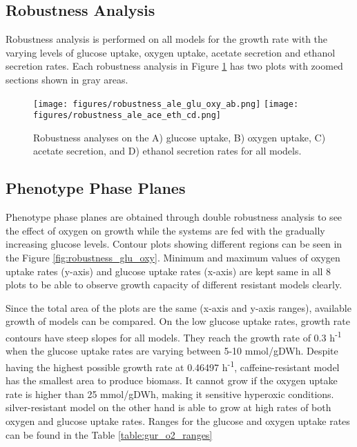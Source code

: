 \subsection{Robustness Analysis}

Robustness analysis is performed on all models for the growth rate with the varying levels of glucose uptake, oxygen uptake, acetate secretion and ethanol secretion rates. Each robustness analysis in Figure \ref{fig:robustness_ale} has two plots with zoomed sections shown in gray areas.

\begin{figure}[H]
  \begin{center}
  \texttt{[image: figures/robustness\_ale\_glu\_oxy\_ab.png]}
  \texttt{[image: figures/robustness\_ale\_ace\_eth\_cd.png]}
  \caption[Robustness analyses on the A) glucose uptake, B) oxygen uptake, C) acetate secretion, and D) ethanol secretion rates for all models.]{Robustness analyses on the A) glucose uptake, B) oxygen uptake, C) acetate secretion, and D) ethanol secretion rates for all models.}
  \label{fig:robustness_ale}
  \end{center}
  \end{figure}


\subsection{Phenotype Phase Planes}

Phenotype phase planes are obtained through double robustness analysis to see the effect of oxygen on growth while the systems are fed with the gradually increasing glucose levels. Contour plots showing different regions can be seen in the Figure \ref{fig:robustness_glu_oxy}. Minimum and maximum values of oxygen uptake rates (y-axis) and glucose uptake rates (x-axis) are kept same in all 8 plots to be able to observe growth capacity of different resistant models clearly.

Since the total area of the plots are the same (x-axis and y-axis ranges), available growth of models can be compared. On the low glucose uptake rates, growth rate contours have steep slopes for all models. They reach the growth rate of 0.3 h\textsuperscript{-1} when the glucose uptake rates are varying between 5-10 mmol/gDWh. Despite having the highest possible growth rate at 0.46497 h\textsuperscript{-1}, caffeine-resistant model has the smallest area to produce biomass. It cannot grow if the oxygen uptake rate is higher than 25 mmol/gDWh, making it sensitive hyperoxic conditions. silver-resistant model on the other hand is able to grow at high rates of both oxygen and glucose uptake rates. Ranges for the glucose and oxygen uptake rates can be found in the Table \ref{table:gur_o2_ranges}



